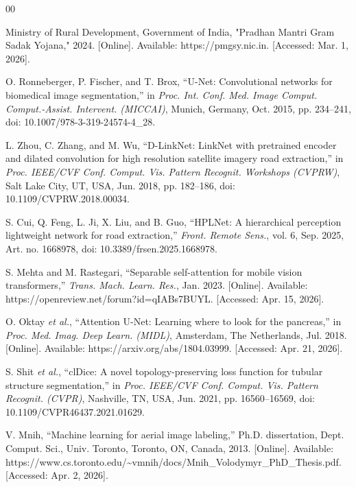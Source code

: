 \documentclass{ieeeaccess}
\begin{document}
\begin{thebibliography}{00}

Ministry of Rural Development, Government of India, "Pradhan Mantri Gram Sadak Yojana," 2024. [Online]. Available: https://pmgsy.nic.in. [Accessed: Mar. 1, 2026].

O. Ronneberger, P. Fischer, and T. Brox, ``U-Net: Convolutional networks for biomedical image segmentation,'' in \emph{Proc. Int. Conf. Med. Image Comput. Comput.-Assist. Intervent. (MICCAI)}, Munich, Germany, Oct. 2015, pp. 234--241, doi: 10.1007/978-3-319-24574-4\_28.

L. Zhou, C. Zhang, and M. Wu, ``D-LinkNet: LinkNet with pretrained encoder and dilated convolution for high resolution satellite imagery road extraction,'' in \emph{Proc. IEEE/CVF Conf. Comput. Vis. Pattern Recognit. Workshops (CVPRW)}, Salt Lake City, UT, USA, Jun. 2018, pp. 182--186, doi: 10.1109/CVPRW.2018.00034.

S. Cui, Q. Feng, L. Ji, X. Liu, and B. Guo, ``HPLNet: A hierarchical perception lightweight network for road extraction,'' \emph{Front. Remote Sens.}, vol. 6, Sep. 2025, Art. no. 1668978, doi: 10.3389/frsen.2025.1668978.

S. Mehta and M. Rastegari, ``Separable self-attention for mobile vision transformers,'' \emph{Trans. Mach. Learn. Res.}, Jan. 2023. [Online]. Available: https://openreview.net/forum?id=qIABs7BUYL. [Accessed: Apr. 15, 2026].

O. Oktay \emph{et al.}, ``Attention U-Net: Learning where to look for the pancreas,'' in \emph{Proc. Med. Imag. Deep Learn. (MIDL)}, Amsterdam, The Netherlands, Jul. 2018. [Online]. Available: https://arxiv.org/abs/1804.03999. [Accessed: Apr. 21, 2026].

S. Shit \emph{et al.}, ``clDice: A novel topology-preserving loss function for tubular structure segmentation,'' in \emph{Proc. IEEE/CVF Conf. Comput. Vis. Pattern Recognit. (CVPR)}, Nashville, TN, USA, Jun. 2021, pp. 16560--16569, doi: 10.1109/CVPR46437.2021.01629.

V. Mnih, ``Machine learning for aerial image labeling,'' Ph.D. dissertation, Dept. Comput. Sci., Univ. Toronto, Toronto, ON, Canada, 2013. [Online]. Available: https://www.cs.toronto.edu/\~{}vmnih/docs/Mnih\_Volodymyr\_PhD\_Thesis.pdf. [Accessed: Apr. 2, 2026].


\end{thebibliography}
\end{document}

